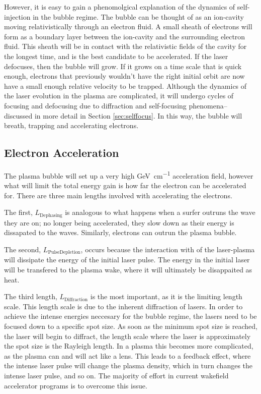\documentclass[12pt,letter]{article}
\begin{document}
However, it is easy to gain a phenomolgical explanation of the dynamics of
self-injection in the bubble regime. The bubble can be thought of as an
ion-cavity moving relativistically through an
electron fluid. A small sheath of electrons will form as a boundary layer
between the ion-cavity and the surrounding electron fluid. This sheath will be
in contact with the relativistic fields of the cavity for the longest time, and
is the best candidate to be accelerated. If the laser defocuses, then the bubble
will grow. If it grows on a time scale that is quick enough, electrons that
previously wouldn't have the right initial orbit are now have a small enough
relative velocity to be trapped. Although the dynamics of the laser evolution in
the plasma are complicated, it will undergo cycles of focusing and defocusing
due to diffraction and self-focusing phenomena-- discussed in more detail in
Section \ref{sec:selffocus}. In this way, the bubble will breath, trapping and
accelerating electrons. 
    
    \subsection{Electron Acceleration}
    The plasma bubble will set up a very high \si{\giga \electronvolt \per
\centi \meter} acceleration field, however what will limit the total energy
    gain is how far the electron can be accelerated for. 
    There are three main lengths involved with accelerating the
    electrons.
    
    The first, $L_\mathrm{Dephasing}$ is analogous to what happens
    when a surfer outruns the wave they are on; no longer being accelerated,
    they slow down as their energy is dissapated to the waves. Similarly, electrons
    can outrun the plasma bubble. 

    The second, $L_\mathrm{Pulse Depletion}$, occurs because the interaction
    with of the laser-plasma will dissipate the energy of the initial laser
    pulse. The energy in the initial laser will be transfered to the plasma
    wake, where it will ultimately be disappaited as heat. 

    The third length, $L_\mathrm{Diffraction}$ is the most important, as it is
    the limiting length scale. This length scale is due to the inherent
    diffraction of lasers. In order to achieve the intense energies neccesary
    for the bubble regime, the lasers need to be focused down to a specific spot
    size. As soon as the minimum spot size is reached, the laser will begin to
    diffract, the length scale where the laser is approximately the spot size is
    the Rayleigh length. In a plasma this becomes more complicated, as the
    plasma can and will act like a lens. This leads to a feedback effect, where
    the intense laser pulse will change the plasma density, which in turn
    changes the intense laser pulse, and so on. The majority of effort in current wakefield accelerator  programs is to overcome this issue.
\end{document}
